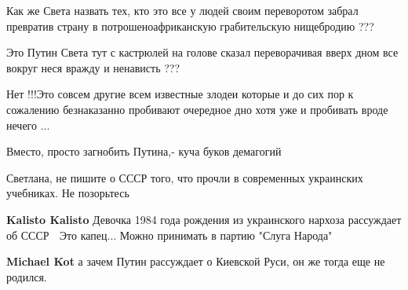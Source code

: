 \begin{itemize}
Как же Света назвать тех, кто это все у людей своим переворотом забрал
превратив страну в потрошеноафриканскую грабительскую нищебродию ???

Это Путин Света тут с кастрюлей на голове сказал переворачивая вверх дном все
вокруг неся вражду и ненависть ???

Нет !!!Это совсем другие всем известные злодеи которые и до сих пор к сожалению
безнаказанно пробивают очередное дно хотя уже и пробивать вроде нечего ...


 
Вместо, просто загнобить Путина,- куча буков демагогий

 
Светлана, не пишите о СССР того, что прочли в современных украинских учебниках. Не позорьтесь

\begin{itemize}
 
\textbf{Kalisto Kalisto} Девочка 1984 года рождения из украинского нархоза рассуждает об СССР 🤦 Это капец... Можно принимать в партию "Слуга Народа"

 
\textbf{Michael Kot} а зачем Путин рассуждает о Киевской Руси, он же тогда еще не родился.

 

\end{itemize}
\end{itemize}
